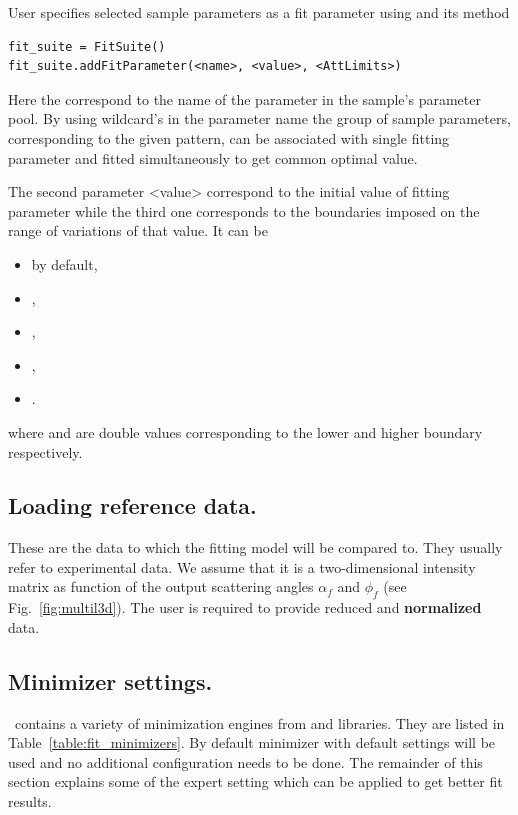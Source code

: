 User specifies selected sample parameters as a fit parameter using 
and its  method

\begin{lstlisting}[language=shell, style=commandline]
fit_suite = FitSuite()
fit_suite.addFitParameter(<name>, <value>, <AttLimits>)
\end{lstlisting}

Here the  correspond to the name of the parameter in the sample's parameter pool.
By using wildcard's in the parameter name the group of sample parameters, corresponding to the given
pattern, can be associated with single fitting parameter and 
fitted simultaneously to get common optimal value.

The second parameter \Code <value> correspond to the initial value of fitting parameter
while the third one  corresponds to
the boundaries imposed on the range of variations of that value. It can be
\begin{itemize}
\item {} by default, 
\item {}, 
\item {}, 
\item {}, 
\item {}.
\end{itemize}
where  and  are
double values corresponding to the lower and higher boundary respectively.



\subsection{Loading reference data.}
These are the data to which the fitting model will
be compared to. They usually refer to experimental data. We assume that it is a
two-dimensional intensity matrix as function of the output scattering
angles $\alpha_f$ and $\phi_f$ (see Fig.~\ref{fig:multil3d}). The user
is required to provide reduced and \textbf{normalized} data. 



\subsection{Minimizer settings.}

\BornAgain\ contains a variety of minimization engines from  and 
libraries. They are listed in Table~\ref{table:fit_minimizers}.
By default  minimizer with default settings will be used and no additional
configuration needs to be done.
The remainder of this section explains some of the expert setting which can be applied to get better 
fit results.

